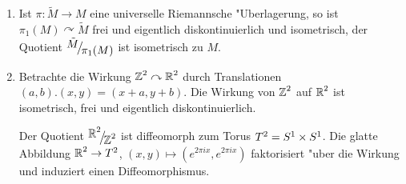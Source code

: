 \begin{Bsp}\begin{enumerate}[label=\arabic*),leftmargin=*]
  \item
    Ist $\pi: \tilde M \to M$ eine universelle Riemannsche "Uberlagerung, so ist $\pi_1(M) \curvearrowright \tilde M$ frei und eigentlich diskontinuierlich und isometrisch, der Quotient $\FakRaum{\tilde M}{\pi_1(M)}$ ist isometrisch zu $M$.
  \item
    Betrachte die Wirkung $\operatorname{\mathbb{Z}}^2 \curvearrowright \operatorname{\mathbb{R}}^2$ durch Translationen $(a,b).(x,y) = (x+a, y+b)$. Die Wirkung von $\operatorname{\mathbb{Z}}^2$ auf $\operatorname{\mathbb{R}}^2$ ist isometrisch, frei und eigentlich diskontinuierlich.
    \begin{bew}
      Der Quotient $\FakRaum{\R^2}{\Z^2}$ ist diffeomorph zum Torus $T^2 = S^1 \times S^1$.
      Die glatte Abbildung $\operatorname{\mathbb{R}}^2 \to T^2$, $(x,y) \mapsto (e^{2 \pi i x}, e^{2 \pi i x})$ faktorisiert "uber die Wirkung und induziert einen Diffeomorphismus.
      \begin{center}
\end{center}
\end{bew}
\end{enumerate}
\end{Bsp}
